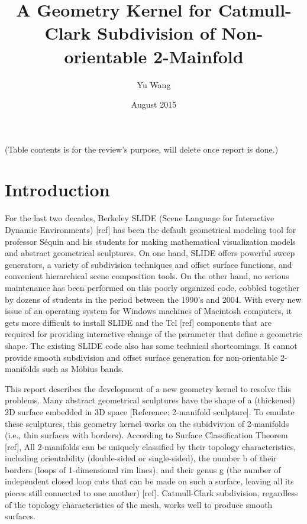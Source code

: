 \documentclass[12pt]{article}
\title{A Geometry Kernel for Catmull-Clark Subdivision of Non-orientable 2-Mainfold}
\author{Yu Wang}
\date{August 2015}
\begin{document}
\maketitle
\newpage

(Table contents is for the review's purpose, will delete once report is done.)
\tableofcontents
\newpage
\section{Introduction}
For the last two decades, Berkeley SLIDE (Scene Language for Interactive Dynamic Environments) [ref] has been the default geometrical modeling tool for professor Séquin and his students for making mathematical visualization models and abstract geometrical sculptures.  On one hand, SLIDE offers powerful sweep generators, a variety of subdivision techniques and offset surface functions, and convenient hierarchical scene composition tools.  On the other hand, no serious maintenance has been performed on this poorly organized code, cobbled together by dozens of students in the period between the 1990’s and 2004.  With every new issue of an operating system for Windows machines of Macintosh computers, it gets more difficult to install SLIDE and the Tcl [ref] components that are required for providing interactive change of the parameter that define a geometric shape. The existing SLIDE code also has some technical shortcomings. It cannot provide smooth subdivision and offset surface generation for non-orientable 2-manifolds such as Möbius bands.  

This report describes the development of a new geometry kernel to resolve this problems. Many abstract geometrical sculptures have the shape of a (thickened) 2D surface embedded in 3D space [Reference: 2-manifold sculpture]. To emulate these sculptures, this geometry kernel works on the subidvivion of 2-manifolds (i.e., thin surfaces with borders). According to Surface Classification Theorem [ref], All 2-manifolds can be uniquely classified by their topology characteristics, including orientability (double-sided or single-sided), the number b of their borders (loops of 1-dimensional rim lines), and their genus g (the number of independent closed loop cuts that can be made on such a surface, leaving all its pieces still connected to one another) [ref]. Catmull-Clark subdivision, regardless of the topology characteristics of the mesh, works well to produce smooth surfaces.
\end{document}
